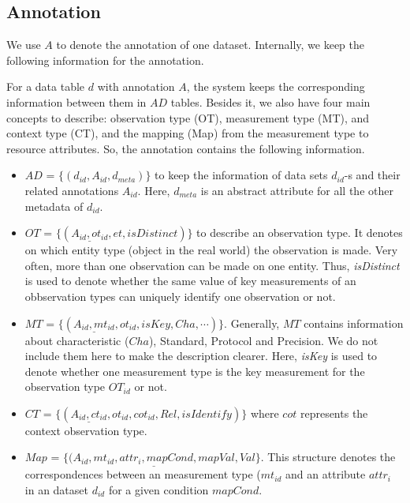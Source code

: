 \documentclass[conference]{IEEEtran}
\begin{document}
\subsection{Annotation}\label{sec:annotation}



We use $A$ to denote the annotation of one dataset. 
Internally, we keep the following information for the
annotation. 

For a data table $d$ with annotation $A$, the system keeps the
corresponding information between them in $AD$ tables. 
Besides it, we also have four main concepts to describe: 
observation type (OT), measurement type (MT), and
context type (CT), and the mapping (Map) from the measurement type to
resource attributes.  
So, the annotation contains the following information. 

\begin{itemize}
\item $AD$ = $\{(d_{id}, A_{id}, d_{meta})\}$ to keep the information
  of data sets $d_{id}$-s and their related annotations
  $A_{id}$. Here, $d_{meta}$ is an abstract attribute for all the
  other metadata of $d_{id}$. 
\item $OT$ = $\{(\underline{A_{id},ot_{id}}, et, isDistinct)\}$ to
  describe an observation type. It denotes on which
  entity type (object in the real world) the observation is made. 
Very often, more than one observation can be made on one entity. Thus,{\em
  isDistinct} is used to denote whether the same value of key
measurements of an obbservation types can uniquely identify one
observation or not. 
\item $MT$ = $\{(\underline{A_{id}, mt_{id}}, ot_{id},isKey,
  Cha, \cdots)\}$. Generally, $MT$ contains information about
  characteristic ($Cha$), Standard, Protocol and Precision. We do not include them
  here to make the description clearer. Here, {\em isKey} is used to denote
  whether one measurement type is the key measurement for the
  observation type $OT_{id}$ or not. 
\item $CT$ = $\{(\underline{A_{id}, ct_{id}}, ot_{id}, cot_{id}, Rel,
  isIdentify)\}$ where $cot$ represents the context observation
  type. 
\item $Map$ = $\{(\underline{A_{id},mt_{id}, attr_i, mapCond, mapVal},
  Val\}$. This structure denotes the correspondences between an
  measurement type ($mt_{id}$ and an attribute $attr_i$ in an dataset
  $d_{id}$ for a given condition $mapCond$. 
\end{itemize}
\end{document}
